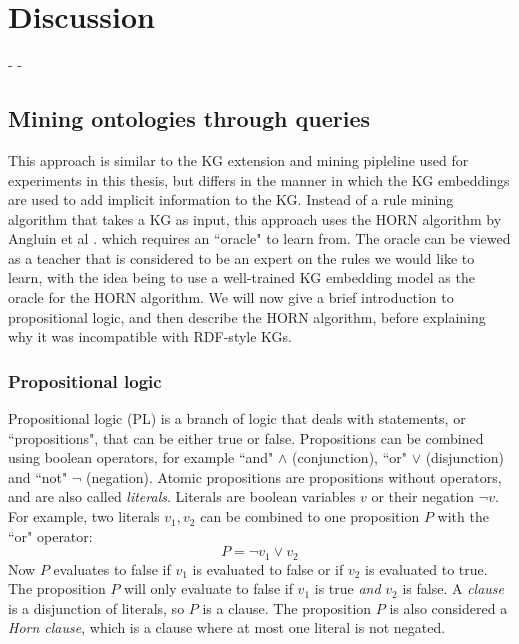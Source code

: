 \chapter{Discussion}



- 
- 


\section{Mining ontologies through queries}
This approach is similar to the KG extension and mining pipleline used for experiments in this thesis, but differs in the manner in which the KG embeddings are used to add implicit information to the KG. Instead of a rule mining algorithm that takes a KG as input, this approach uses the HORN algorithm by Angluin et al \cite{DBLP:journals/ml/AngluinFP92}. which requires an ``oracle" to learn from. The oracle can be viewed as a teacher that is considered to be an expert on the rules we would like to learn, with the idea being to use a well-trained KG embedding model as the oracle for the HORN algorithm. We will now give a brief introduction to propositional logic, and then describe the HORN algorithm, before explaining why it was incompatible with RDF-style KGs.

\subsection{Propositional logic}

Propositional logic (PL) is a branch of logic that deals with statements, or ``propositions", that can be either true or false. Propositions can be combined using boolean operators, for example ``and" $\wedge$ (conjunction), ``or" $\vee$ (disjunction) and ``not" $\neg$ (negation). Atomic propositions are propositions without operators, and are also called \textit{literals}. Literals are boolean variables $v$ or their negation $\neg v$. For example, two literals $v_1, v_2$ can be combined to one proposition $P$ with the ``or" operator:
\[P = \neg v_1 \vee v_2\]
Now $P$ evaluates to false if $v_1$ is evaluated to false or if $v_2$ is evaluated to true. The proposition $P$ will only evaluate to false if $v_1$ is true \textit{and} $v_2$ is false. A \textit{clause} is a disjunction of literals, so $P$ is a clause. The proposition $P$ is also considered a \textit{Horn clause}, which is a clause where at most one literal is not negated. 

